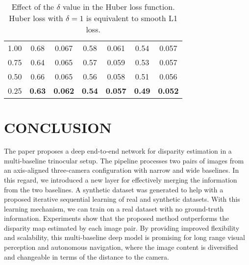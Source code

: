 \documentclass[10pt,twocolumn,letterpaper]{article}
\begin{document}
\begin{table}[tbp]
\begin{center}
\begin{tabular}{@{\hskip1pt}l@{\hskip1pt}|@{\hskip1pt}c@{\hskip1pt}c@{\hskip1pt}|@{\hskip1pt}c@{\hskip1pt}c@{\hskip1pt}|@{\hskip1pt}c@{\hskip1pt}c@{\hskip1pt}}
			\multicolumn{1}{l|}{1.00} & \multicolumn{1}{c|}{0.68}    &  \hspace{0.1cm}0.067  & \multicolumn{1}{c|}{0.58}    & \hspace{0.1cm}0.061   & \multicolumn{1}{c|}{0.54}    &  \hspace{0.1cm}0.057  \\ 	
			
			\multicolumn{1}{l|}{0.75} & \multicolumn{1}{c|}{0.64}    &  \hspace{0.1cm}0.065  & \multicolumn{1}{c|}{0.57}    & \hspace{0.1cm}0.059   & \multicolumn{1}{c|}{0.53}    &  \hspace{0.1cm}0.057  \\ 	
			
			\multicolumn{1}{l|}{0.50} & \multicolumn{1}{c|}{0.66}    &  \hspace{0.1cm}0.065  & \multicolumn{1}{c|}{0.56}    & \hspace{0.1cm}0.058   & \multicolumn{1}{c|}{0.51}    &  \hspace{0.1cm}0.056  \\ 	
			
			\multicolumn{1}{l|}{0.25} & \multicolumn{1}{c|}{\textbf{0.63}}    & \hspace{0.1cm}\textbf{0.062}   & \multicolumn{1}{c|}{\textbf{0.54}}    & \hspace{0.1cm}\textbf{0.057}   & \multicolumn{1}{c|}{\textbf{0.49}}    &  \hspace{0.1cm}\textbf{0.052}  \\ \hline
		\end{tabular}
	\end{center}
	\vspace{-0.3cm}
	\caption{Effect of the $\delta$ value in the Huber loss function. Huber loss with $\delta=1$ is equivalent to smooth L1 loss.}	
	\label{tab:Loss}
\end{table} \section{CONCLUSION}
\label{Conclusion}
The paper proposes a deep end-to-end network for disparity estimation in a multi-baseline trinocular setup. The pipeline processes two pairs of images from an axis-aligned three-camera configuration with narrow and wide baselines. In this regard, we introduced a new layer for effectively merging the information from the two baselines. A synthetic dataset was generated to help with a proposed iterative sequential learning of real and synthetic datasets. With this learning mechanism, we can train on a real dataset with no ground-truth information. Experiments show that the proposed method outperforms the disparity map estimated by each image pair. By providing improved flexibility and scalability, this multi-baseline deep model is promising for long range visual perception and autonomous navigation, where the image content is diversified and changeable in terms of the distance to the camera.
{\small
	
	
}
\end{document}
